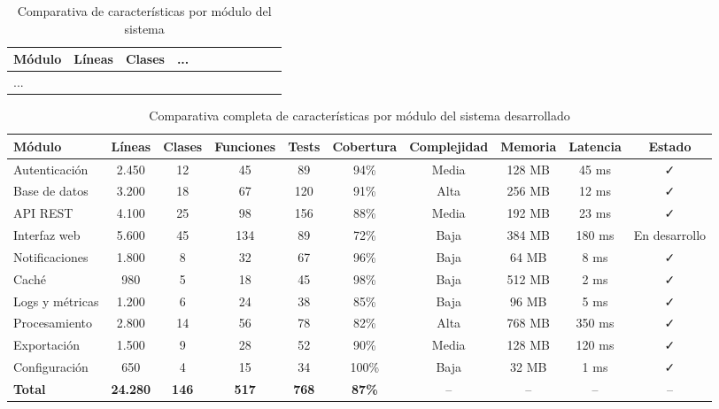 \begin{latexcode}[title={Código de tabla rotada}]
\begin{table}
  \centering
  \caption{Comparativa de características por módulo del sistema}
  \label{tab:comparativa-modulos}
  \begin{tabular}{lcccccccccc}
    \toprule
    \textbf{Módulo} & \textbf{Líneas} & \textbf{Clases} & ... \\
    \midrule
    ...
    \bottomrule
  \end{tabular}
\end{table}
\end{latexcode}

\begin{table}
  \centering
  \caption{Comparativa completa de características por módulo del sistema desarrollado}
  \label{tab:comparativa-modulos_render}
  \small %
  \EPScabeceraTabla
  \begin{tabular}{@{}lccccccccc@{}}
    \toprule
    \textbf{Módulo} &
    \textbf{Líneas} &
    \textbf{Clases} &
    \textbf{Funciones} &
    \textbf{Tests} &
    \textbf{Cobertura} &
    \textbf{Complejidad} &
    \textbf{Memoria} &
    \textbf{Latencia} &
    \textbf{Estado} \\
    \midrule
    Autenticación    & 2.450  & 12 & 45  & 89  & 94\% & Media & 128 MB & 45 ms  & \faCheck \\
    Base de datos    & 3.200  & 18 & 67  & 120 & 91\% & Alta  & 256 MB & 12 ms  & \faCheck \\
    API REST         & 4.100  & 25 & 98  & 156 & 88\% & Media & 192 MB & 23 ms  & \faCheck \\
    Interfaz web     & 5.600  & 45 & 134 & 89  & 72\% & Baja  & 384 MB & 180 ms & En desarrollo \\
    Notificaciones   & 1.800  & 8  & 32  & 67  & 96\% & Baja  & 64 MB  & 8 ms   & \faCheck \\
    Caché            & 980    & 5  & 18  & 45  & 98\% & Baja  & 512 MB & 2 ms   & \faCheck \\
    Logs y métricas  & 1.200  & 6  & 24  & 38  & 85\% & Baja  & 96 MB  & 5 ms   & \faCheck \\
    Procesamiento    & 2.800  & 14 & 56  & 78  & 82\% & Alta  & 768 MB & 350 ms & \faCheck \\
    Exportación      & 1.500  & 9  & 28  & 52  & 90\% & Media & 128 MB & 120 ms & \faCheck \\
    Configuración    & 650    & 4  & 15  & 34  & 100\%& Baja  & 32 MB  & 1 ms   & \faCheck \\
    \midrule
    \textbf{Total}   & \textbf{24.280} & \textbf{146} & \textbf{517} & \textbf{768} & \textbf{87\%} & -- & -- & -- & -- \\
    \bottomrule
  \end{tabular}
\end{table}

